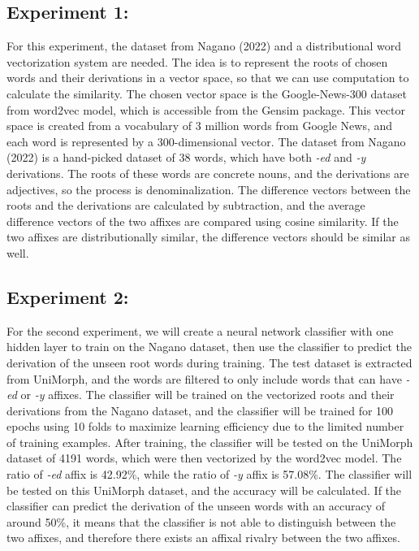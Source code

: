 \documentclass[12pt]{article}
\begin{document}
\subsection*{Experiment 1:}
    For this experiment, the dataset from Nagano (2022) and a distributional word vectorization system are needed. The idea is to represent the roots of chosen words and their derivations in a vector space, so that we can use computation to calculate the similarity. The chosen vector space is the Google-News-300 dataset from word2vec model, which is accessible from the Gensim package. This vector space is created from a vocabulary of 3 million words from Google News, and each word is represented by a 300-dimensional vector. The dataset from Nagano (2022) is a hand-picked dataset of 38 words, which have both \emph{-ed} and \emph{-y} derivations. The roots of these words are concrete nouns, and the derivations are adjectives, so the process is denominalization. The difference vectors between the roots and the derivations are calculated by subtraction, and the average difference vectors of the two affixes are compared using cosine similarity. If the two affixes are distributionally similar, the difference vectors should be similar as well.

\subsection{Experiment 2:}
    For the second experiment, we will create a neural network classifier with one hidden layer to train on the Nagano dataset, then use the classifier to predict the derivation of the unseen root words during training. The test dataset is extracted from UniMorph, and the words are filtered to only include words that can have \emph{-ed} or \emph{-y} affixes. The classifier will be trained on the vectorized roots and their derivations from the Nagano dataset, and the classifier will be trained for 100 epochs using 10 folds to maximize learning efficiency due to the limited number of training examples. After training, the classifier will be tested on the UniMorph dataset of 4191 words, which were then vectorized by the word2vec model. The ratio of \emph{-ed} affix is 42.92\%, while the ratio of \emph{-y} affix is 57.08\%. The classifier will be tested on this UniMorph dataset, and the accuracy will be calculated. If the classifier can predict the derivation of the unseen words with an accuracy of around 50\%, it means that the classifier is not able to distinguish between the two affixes, and therefore there exists an affixal rivalry between the two affixes.
\end{document}
